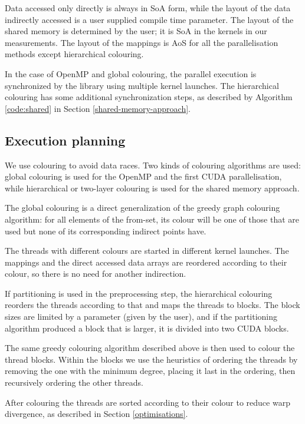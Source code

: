 Data accessed only directly is always in SoA form, while the layout of the
data indirectly accessed is a user supplied compile time parameter. The layout
of the shared memory is determined by the user; it is SoA in the kernels in our
measurements. The layout of the mappings is AoS for all the parallelisation
methods except hierarchical colouring.

In the case of OpenMP and global colouring, the parallel execution is
synchronized by the library using multiple kernel launches. The hierarchical
colouring has some additional synchronization steps, as described by Algorithm
\ref{code:shared} in Section \ref{shared-memory-approach}.

\subsection{Execution planning}

We use colouring to avoid data races. Two kinds of colouring algorithms are
used: global colouring is used for the OpenMP and the first CUDA
parallelisation, while hierarchical or two-layer colouring is used for the
shared memory approach.

The global colouring is a direct generalization of the greedy graph colouring
algorithm: for all elements of the from-set, its colour will be one of those
that are used but none of its corresponding indirect points have.

The threads with different colours are started in different kernel launches. The
mappings and the direct accessed data arrays are reordered according to their
colour, so there is no need for another indirection.

If partitioning is used in the preprocessing step, the hierarchical colouring
reorders the threads according to that and maps the threads to blocks. The block
sizes are limited by a parameter (given by the user), and if the partitioning
algorithm produced a block that is larger, it is divided into two CUDA blocks.

The same greedy colouring algorithm described above is then used to colour the
thread blocks. Within the blocks we use the heuristics of ordering the threads
by removing the one with the minimum degree, placing it last in the ordering,
then recursively ordering the other threads.

After colouring the threads are sorted according to their colour to reduce warp
divergence, as described in Section \ref{optimisations}.

